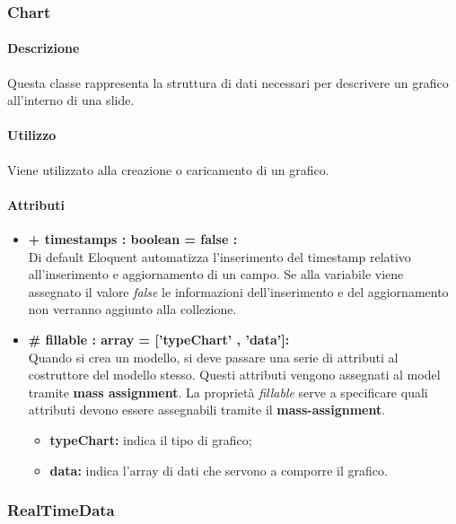 \subsubsection{Chart}




	\paragraph{Descrizione}
	Questa classe rappresenta la struttura di dati necessari per descrivere un grafico all'interno di una slide.
	
	\paragraph{Utilizzo}
	Viene utilizzato alla creazione o caricamento di un grafico.

	\paragraph{Attributi}
	\begin{itemize}
		\item \textbf{+ timestamps : boolean = false :}\\
		Di default Eloquent automatizza l'inserimento del timestamp relativo all'inserimento e aggiornamento di un campo. Se alla variabile viene assegnato il valore \textit{false} le informazioni dell'inserimento e del aggiornamento non verranno aggiunto alla collezione.
		\item \textbf{\# fillable : array = [’typeChart’ , ’data’]:}\\
		Quando si crea un modello, si deve passare una serie di attributi al costruttore del modello stesso. Questi attributi vengono assegnati al model tramite \textbf{mass assignment}. La proprietà \textit{fillable} serve a specificare quali attributi devono essere assegnabili tramite il \textbf{mass-assignment}.
		\begin{itemize}
			\item \textbf{typeChart:} indica il tipo di grafico;
			\item \textbf{data:} indica l'array di dati che servono a comporre il grafico.
		\end{itemize}
		
	\end{itemize}
\newpage


\subsubsection{RealTimeData}

